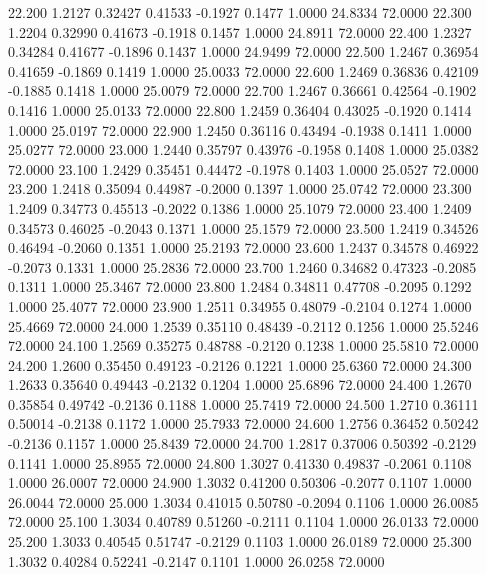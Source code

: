   22.200   1.2127   0.32427   0.41533  -0.1927   0.1477   1.0000  24.8334  72.0000
  22.300   1.2204   0.32990   0.41673  -0.1918   0.1457   1.0000  24.8911  72.0000
  22.400   1.2327   0.34284   0.41677  -0.1896   0.1437   1.0000  24.9499  72.0000
  22.500   1.2467   0.36954   0.41659  -0.1869   0.1419   1.0000  25.0033  72.0000
  22.600   1.2469   0.36836   0.42109  -0.1885   0.1418   1.0000  25.0079  72.0000
  22.700   1.2467   0.36661   0.42564  -0.1902   0.1416   1.0000  25.0133  72.0000
  22.800   1.2459   0.36404   0.43025  -0.1920   0.1414   1.0000  25.0197  72.0000
  22.900   1.2450   0.36116   0.43494  -0.1938   0.1411   1.0000  25.0277  72.0000
  23.000   1.2440   0.35797   0.43976  -0.1958   0.1408   1.0000  25.0382  72.0000
  23.100   1.2429   0.35451   0.44472  -0.1978   0.1403   1.0000  25.0527  72.0000
  23.200   1.2418   0.35094   0.44987  -0.2000   0.1397   1.0000  25.0742  72.0000
  23.300   1.2409   0.34773   0.45513  -0.2022   0.1386   1.0000  25.1079  72.0000
  23.400   1.2409   0.34573   0.46025  -0.2043   0.1371   1.0000  25.1579  72.0000
  23.500   1.2419   0.34526   0.46494  -0.2060   0.1351   1.0000  25.2193  72.0000
  23.600   1.2437   0.34578   0.46922  -0.2073   0.1331   1.0000  25.2836  72.0000
  23.700   1.2460   0.34682   0.47323  -0.2085   0.1311   1.0000  25.3467  72.0000
  23.800   1.2484   0.34811   0.47708  -0.2095   0.1292   1.0000  25.4077  72.0000
  23.900   1.2511   0.34955   0.48079  -0.2104   0.1274   1.0000  25.4669  72.0000
  24.000   1.2539   0.35110   0.48439  -0.2112   0.1256   1.0000  25.5246  72.0000
  24.100   1.2569   0.35275   0.48788  -0.2120   0.1238   1.0000  25.5810  72.0000
  24.200   1.2600   0.35450   0.49123  -0.2126   0.1221   1.0000  25.6360  72.0000
  24.300   1.2633   0.35640   0.49443  -0.2132   0.1204   1.0000  25.6896  72.0000
  24.400   1.2670   0.35854   0.49742  -0.2136   0.1188   1.0000  25.7419  72.0000
  24.500   1.2710   0.36111   0.50014  -0.2138   0.1172   1.0000  25.7933  72.0000
  24.600   1.2756   0.36452   0.50242  -0.2136   0.1157   1.0000  25.8439  72.0000
  24.700   1.2817   0.37006   0.50392  -0.2129   0.1141   1.0000  25.8955  72.0000
  24.800   1.3027   0.41330   0.49837  -0.2061   0.1108   1.0000  26.0007  72.0000
  24.900   1.3032   0.41200   0.50306  -0.2077   0.1107   1.0000  26.0044  72.0000
  25.000   1.3034   0.41015   0.50780  -0.2094   0.1106   1.0000  26.0085  72.0000
  25.100   1.3034   0.40789   0.51260  -0.2111   0.1104   1.0000  26.0133  72.0000
  25.200   1.3033   0.40545   0.51747  -0.2129   0.1103   1.0000  26.0189  72.0000
  25.300   1.3032   0.40284   0.52241  -0.2147   0.1101   1.0000  26.0258  72.0000
